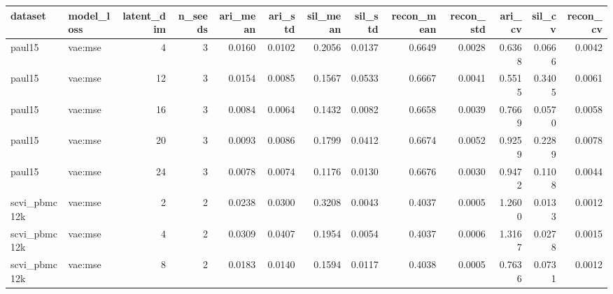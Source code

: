 \begin{tabular}{llrrrrrrrrrrr}
\toprule
dataset & model\_loss & latent\_dim & n\_seeds & ari\_mean & ari\_std & sil\_mean & sil\_std & recon\_mean & recon\_std & ari\_cv & sil\_cv & recon\_cv \\
\midrule
paul15 & vae:mse & 4 & 3 & 0.0160 & 0.0102 & 0.2056 & 0.0137 & 0.6649 & 0.0028 & 0.6368 & 0.0666 & 0.0042 \\
paul15 & vae:mse & 12 & 3 & 0.0154 & 0.0085 & 0.1567 & 0.0533 & 0.6667 & 0.0041 & 0.5515 & 0.3405 & 0.0061 \\
paul15 & vae:mse & 16 & 3 & 0.0084 & 0.0064 & 0.1432 & 0.0082 & 0.6658 & 0.0039 & 0.7669 & 0.0570 & 0.0058 \\
paul15 & vae:mse & 20 & 3 & 0.0093 & 0.0086 & 0.1799 & 0.0412 & 0.6674 & 0.0052 & 0.9259 & 0.2289 & 0.0078 \\
paul15 & vae:mse & 24 & 3 & 0.0078 & 0.0074 & 0.1176 & 0.0130 & 0.6676 & 0.0030 & 0.9472 & 0.1108 & 0.0044 \\
scvi\_pbmc12k & vae:mse & 2 & 2 & 0.0238 & 0.0300 & 0.3208 & 0.0043 & 0.4037 & 0.0005 & 1.2600 & 0.0133 & 0.0012 \\
scvi\_pbmc12k & vae:mse & 4 & 2 & 0.0309 & 0.0407 & 0.1954 & 0.0054 & 0.4037 & 0.0006 & 1.3167 & 0.0278 & 0.0015 \\
scvi\_pbmc12k & vae:mse & 8 & 2 & 0.0183 & 0.0140 & 0.1594 & 0.0117 & 0.4038 & 0.0005 & 0.7636 & 0.0731 & 0.0012 \\
\bottomrule
\end{tabular}
